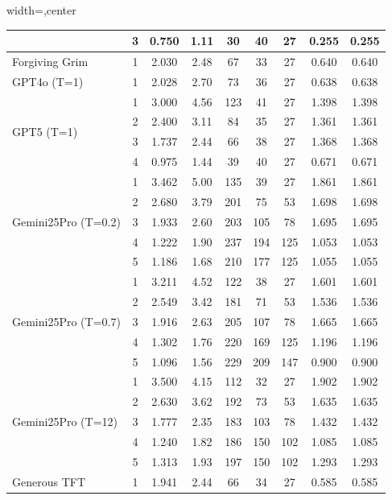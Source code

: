 \begin{table}[htbp]
\begin{adjustbox}{width=\textwidth,center}
\begin{tabular}{|l|c|c|c|c|c|c|c|c|}
 & 
3 & 
0.750 & 
1.11 & 
30 & 
40 & 
27 & 
0.255 & 
0.255 \\
\hline
\multirow{1}{*}{Forgiving Grim} & 
1 & 
2.030 & 
2.48 & 
67 & 
33 & 
27 & 
0.640 & 
0.640 \\
\hline
\multirow{1}{*}{GPT4o (T=1)} & 
1 & 
2.028 & 
2.70 & 
73 & 
36 & 
27 & 
0.638 & 
0.638 \\
\hline
\multirow{4}{*}{GPT5 (T=1)} & 
1 & 
3.000 & 
4.56 & 
123 & 
41 & 
27 & 
1.398 & 
1.398 \\
 & 
2 & 
2.400 & 
3.11 & 
84 & 
35 & 
27 & 
1.361 & 
1.361 \\
 & 
3 & 
1.737 & 
2.44 & 
66 & 
38 & 
27 & 
1.368 & 
1.368 \\
 & 
4 & 
0.975 & 
1.44 & 
39 & 
40 & 
27 & 
0.671 & 
0.671 \\
\hline
\multirow{5}{*}{Gemini25Pro (T=0.2)} & 
1 & 
3.462 & 
5.00 & 
135 & 
39 & 
27 & 
1.861 & 
1.861 \\
 & 
2 & 
2.680 & 
3.79 & 
201 & 
75 & 
53 & 
1.698 & 
1.698 \\
 & 
3 & 
1.933 & 
2.60 & 
203 & 
105 & 
78 & 
1.695 & 
1.695 \\
 & 
4 & 
1.222 & 
1.90 & 
237 & 
194 & 
125 & 
1.053 & 
1.053 \\
 & 
5 & 
1.186 & 
1.68 & 
210 & 
177 & 
125 & 
1.055 & 
1.055 \\
\hline
\multirow{5}{*}{Gemini25Pro (T=0.7)} & 
1 & 
3.211 & 
4.52 & 
122 & 
38 & 
27 & 
1.601 & 
1.601 \\
 & 
2 & 
2.549 & 
3.42 & 
181 & 
71 & 
53 & 
1.536 & 
1.536 \\
 & 
3 & 
1.916 & 
2.63 & 
205 & 
107 & 
78 & 
1.665 & 
1.665 \\
 & 
4 & 
1.302 & 
1.76 & 
220 & 
169 & 
125 & 
1.196 & 
1.196 \\
 & 
5 & 
1.096 & 
1.56 & 
229 & 
209 & 
147 & 
0.900 & 
0.900 \\
\hline
\multirow{5}{*}{Gemini25Pro (T=12)} & 
1 & 
3.500 & 
4.15 & 
112 & 
32 & 
27 & 
1.902 & 
1.902 \\
 & 
2 & 
2.630 & 
3.62 & 
192 & 
73 & 
53 & 
1.635 & 
1.635 \\
 & 
3 & 
1.777 & 
2.35 & 
183 & 
103 & 
78 & 
1.432 & 
1.432 \\
 & 
4 & 
1.240 & 
1.82 & 
186 & 
150 & 
102 & 
1.085 & 
1.085 \\
 & 
5 & 
1.313 & 
1.93 & 
197 & 
150 & 
102 & 
1.293 & 
1.293 \\
\hline
\multirow{1}{*}{Generous TFT} & 
1 & 
1.941 & 
2.44 & 
66 & 
34 & 
27 & 
0.585 & 
0.585 \\

\end{tabular}
\end{adjustbox}
\end{table}

